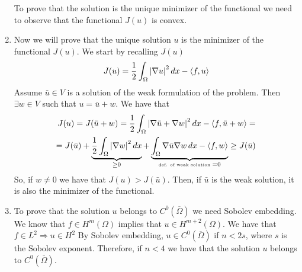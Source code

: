 \begin{enumerate}
          To prove that the solution is the unique minimizer of the functional we need to
          observe that the functional \(J(u)\) is convex.
    \item Now we will prove that the unique solution \(u\) is the minimizer of the
          functional \(J(u)\). We start by recalling \(J(u)\)
          \[
              J(u) = \frac{1}{2} \int_\Omega \abs{\nabla u}^2 \, dx - \langle f, u \rangle
          \]
          Assume \(\bar{u} \in V\) is a solution of the weak formulation of the problem.
          Then \(\exists w \in V\) such that \(u = \bar{u} + w\). We have that
          \[
              \begin{split}
                  J(u) = J(\bar{u} + w) = \frac{1}{2} \int_\Omega \abs{\nabla \bar{u} + \nabla w}^2 \, dx - \langle f, \bar{u} + w \rangle = \\
                  =J(\bar{u}) + \underbrace{\frac{1}{2}\int_\Omega \abs{\nabla w}^2 \, dx}_{\geq 0} + \underbrace{\int_\Omega \nabla \bar{u} \nabla w \, dx - \langle f, w \rangle}_{\text{\tiny def. of weak solution } = 0} \geq J(\bar{u})
              \end{split}
          \]
          So, if \(w \neq 0\) we have that \(J(u) > J(\bar{u})\). Then, if \(\bar{u}\) is
          the weak solution, it is also the minimizer of the functional.
    \item To prove that the solution \(u\) belongs to \(C^0(\overline{\Omega})\) we need
          Sobolev embedding. We know that \(f \in H^m(\Omega)\) implies that \(u \in
          H^{m+2}(\Omega)\). We have that \(f \in L^2 \Rightarrow u \in H^2\) By Sobolev
          embedding, \(u \in C^0(\overline{\Omega})\) if \(n < 2s\), where \(s\) is the
          Sobolev exponent. Therefore, if \(n < 4\) we have that the solution \(u\)
          belongs to \(C^0(\overline{\Omega})\).
\end{enumerate}

\newpage
